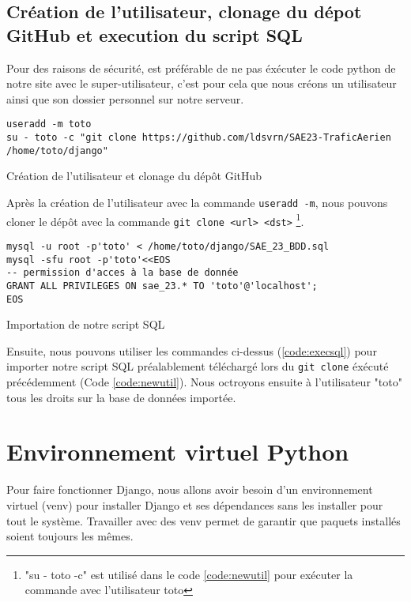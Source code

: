 \documentclass{article}
\begin{document}
        \subsection{Création de l'utilisateur, clonage du dépot GitHub et execution du script SQL}
        Pour des raisons de sécurité, est préférable de ne pas éxécuter le code python de notre site avec le super-utilisateur, c'est pour cela que nous créons un utilisateur ainsi que son dossier personnel sur notre serveur. 
        \begin{listing}[H]
            \begin{verbatim}
useradd -m toto
su - toto -c "git clone https://github.com/ldsvrn/SAE23-TraficAerien /home/toto/django"
            \end{verbatim}
            \caption{Création de l'utilisateur et clonage du dépôt GitHub}
            \label{code:newutil}
        \end{listing}
        Après la création de l'utilisateur avec la commande \verb|useradd -m|, nous pouvons cloner le dépôt avec la commande \verb|git clone <url> <dst>|
        \footnote{\label{note1}"su - toto -c" est utilisé dans le code \ref{code:newutil} pour exécuter la commande avec l'utilisateur toto}.

        \begin{listing}[H]
            \begin{verbatim}
mysql -u root -p'toto' < /home/toto/django/SAE_23_BDD.sql
mysql -sfu root -p'toto'<<EOS
-- permission d'acces à la base de donnée
GRANT ALL PRIVILEGES ON sae_23.* TO 'toto'@'localhost';
EOS
            \end{verbatim}
            \caption{Importation de notre script SQL}
            \label{code:execsql}
        \end{listing}
        Ensuite, nous pouvons utiliser les commandes ci-dessus (\ref{code:execsql}) pour importer notre script SQL préalablement téléchargé lors du \verb|git clone| éxécuté précédemment (Code \ref{code:newutil}). Nous octroyons ensuite à l'utilisateur "toto" tous les droits sur la base de données importée.

\section{Environnement virtuel Python}
    Pour faire fonctionner Django, nous allons avoir besoin d'un environnement virtuel (venv) pour installer Django et ses dépendances sans les installer pour tout le système. Travailler avec des venv permet de garantir que paquets installés soient toujours les mêmes. 
\end{document}
